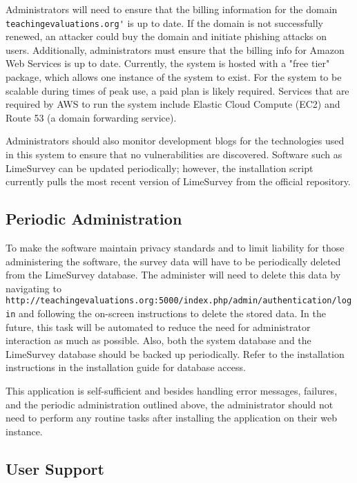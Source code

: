\documentclass{article}
\begin{document}
Administrators will need to ensure that the billing information for the domain \verb|teachingevaluations.org'| is up to date. If the domain is not successfully renewed, an attacker could buy the domain and initiate phishing attacks on users. Additionally, administrators must ensure that the billing info for Amazon Web Services is up to date. Currently, the system is hosted with a "free tier" package, which allows one instance of the system to exist. For the system to be scalable during times of peak use, a paid plan is likely required. Services that are required by AWS to run the system include Elastic Cloud Compute (EC2) and Route 53 (a domain forwarding service). 

Administrators should also monitor development blogs for the technologies used in this system to ensure that no vulnerabilities are discovered. Software such as LimeSurvey can be updated periodically; however, the installation script currently pulls the most recent version of LimeSurvey from the official repository.  

\subsection{Periodic Administration}

To make the software maintain privacy standards and to limit liability for those administering the software, the survey data will have to be periodically deleted from the LimeSurvey database.  The administer will need to delete this data by navigating to \newline \verb|http://teachingevaluations.org:5000/index.php/admin/authentication/login| and following the on-screen instructions to delete the stored data. In the future, this task will be automated to reduce the need for administrator interaction as much as possible. Also, both the system database and the LimeSurvey database should be backed up periodically. Refer to the installation instructions in the installation guide for database access.

This application is self-sufficient and besides handling error messages, failures, and the periodic administration outlined above, the administrator should not need to perform any routine tasks after installing the application on their web instance.

\subsection{User Support}
\end{document}
